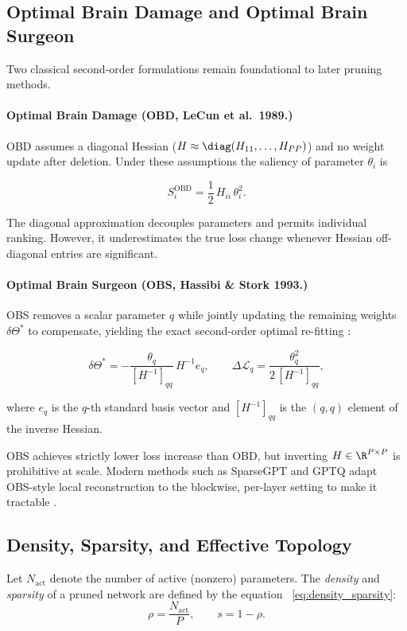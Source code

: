 \subsection{Optimal Brain Damage and Optimal Brain Surgeon}

Two classical second-order formulations remain foundational to later pruning
methods.

\paragraph{Optimal Brain Damage (OBD, LeCun et al.\ 1989.)}
OBD assumes a diagonal Hessian ($H \approx \diag(H_{11}, \ldots, H_{PP})$)
and no weight update after deletion.  Under these assumptions the saliency of
parameter $\theta_i$ is \cite{lecun1989optimal}

\begin{equation}
	S_i^{\mathrm{OBD}} = \frac{1}{2}\, H_{ii}\,\theta_i^2.
	\label{eq:obd}
\end{equation}

The diagonal approximation decouples parameters and permits individual
ranking.  However, it underestimates the true loss change whenever Hessian
off-diagonal entries are significant.

\paragraph{Optimal Brain Surgeon (OBS, Hassibi \& Stork 1993.)}
OBS removes a scalar parameter $q$ while jointly updating the remaining
weights $\delta\Theta^*$ to compensate, yielding the exact second-order
optimal re-fitting \cite{hassibi1993second}:

\begin{equation}
	\delta\Theta^* = -\frac{\theta_q}{[H^{-1}]_{qq}}\, H^{-1} e_q,
	\qquad
	\Delta\mathcal{L}_q = \frac{\theta_q^2}{2\,[H^{-1}]_{qq}},
	\label{eq:obs}
\end{equation}

where $e_q$ is the $q$-th standard basis vector and $[H^{-1}]_{qq}$ is the
$(q,q)$ element of the inverse Hessian.

OBS achieves strictly lower loss
increase than OBD, but inverting $H \in \R^{P \times P}$ is prohibitive at
scale.  Modern methods such as SparseGPT and GPTQ adapt OBS-style local
reconstruction to the blockwise, per-layer setting to make it tractable
\cite{frantar2023sparsegpt,frantar2022gptq}.

\subsection{Density, Sparsity, and Effective Topology}
	Let $N_\mathrm{act}$ denote the number of active (nonzero) parameters.
	The \emph{density} and \emph{sparsity} of a pruned network are defined by the equation ~\eqref{eq:density_sparsity}:
	\begin{equation}
		\rho = \frac{N_\mathrm{act}}{P}, \qquad s = 1 - \rho.
		\label{eq:density_sparsity}
	\end{equation}

